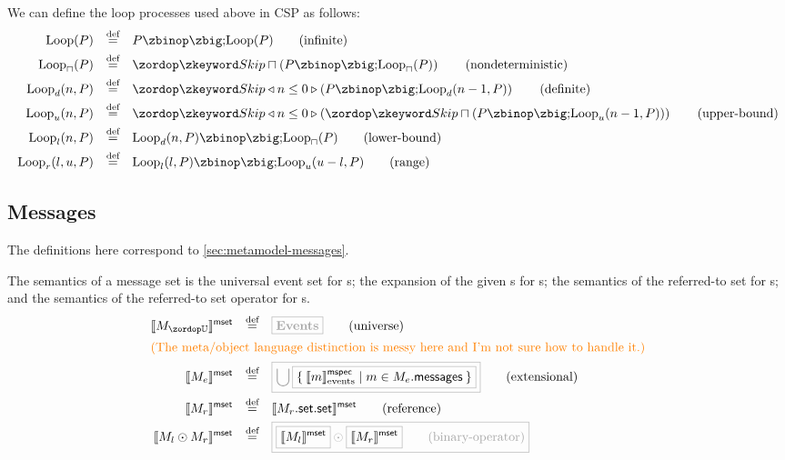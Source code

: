 \begin{definition}

We can define the loop processes used above in CSP as follows:
%
\begin{align*}
  \iloop{P}
  \quad\defeq\quad
  & P \circseq \iloop{P}
    \tag{infinite}
  \\
  \nloop{P}
  \quad\defeq\quad
  & \Skip \sqcap \left(P \circseq \nloop{P}\right)
    \tag{nondeterministic}
  \\  
  \dloop{n}{P}
  \quad\defeq\quad
  & \Skip \triangleleft n \leq 0 \triangleright \left(P \circseq \dloop{n-1}{P}\right)
    \tag{definite}
  \\
  \uloop{n}{P}
  \quad\defeq\quad
  & \Skip \triangleleft n \leq 0 \triangleright \left(\Skip \sqcap \left(P \circseq \uloop{n-1}{P}\right)\right)
    \tag{upper-bound}
  \\
  \lloop{n}{P}
  \quad\defeq\quad
  & \dloop{n}{P} \circseq \nloop{P}
    \tag{lower-bound}
  \\
  \rloop{l}{u}{P}
  \quad\defeq\quad
  & \lloop{l}{P} \circseq \uloop{u - l}{P}
    \tag{range}
  \\
\end{align*}
\end{definition}

\subsection{Messages}\label{ssec:semantics-tockcsp-messages}

The definitions here correspond to \cref{sec:metamodel-messages}.

\begin{definition}[\mmessageset]

  The semantics of a message set is the universal event set for \muniversemessageset s;
  the expansion of the given \mgapmessagespec s for \mextensionalmessageset s;
  the semantics of the referred-to set for \mrefmessageset s;
  and the semantics of the referred-to set operator for \mbinarymessageset s.
%
\begin{align*}
  \msgsetsema{\aumsgset}
  \quad\defeq\quad
  &
    \tlang{\events}
    \tag{universe}
  \\
  \intertext{\todo{The meta/object language distinction is messy here
  and I'm not sure how to handle it.}}
  \msgsetsema{\anemsgset}
  \quad\defeq\quad
  &
    \tlang{
    \bigcup
    \olang{
    \Set{
    \emspecsema{\amspec} | \amspec \in \field{\anemsgset}{messages}
    }
    }
    }
    \tag{extensional}
  \\
  \msgsetsema{\armsgset}
  \quad\defeq\quad
  &
    \msgsetsema{\field{\field{\armsgset}{set}}{set}}
    \tag{reference}
  \\
  \msgsetsema{\amsgset_l \odot \amsgset_r}
  \quad\defeq\quad
  &
  \tlang{
    \olang{\msgsetsema{\amsgset_l}}
    \odot
    \olang{\msgsetsema{\amsgset_r}}
    \tag{binary-operator}
  }
\end{align*}
\end{definition}


